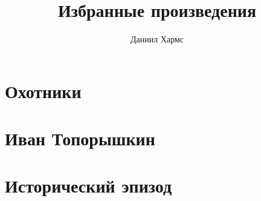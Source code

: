 \documentclass[12pt, a4paper]{book}
\title{Избранные произведения}
\author{Даниил Хармс}
\date{}
\begin{document}
\maketitle

\chapter*{Охотники}


\chapter*{Иван Топорышкин}


\chapter*{Исторический эпизод}

\end{document}
